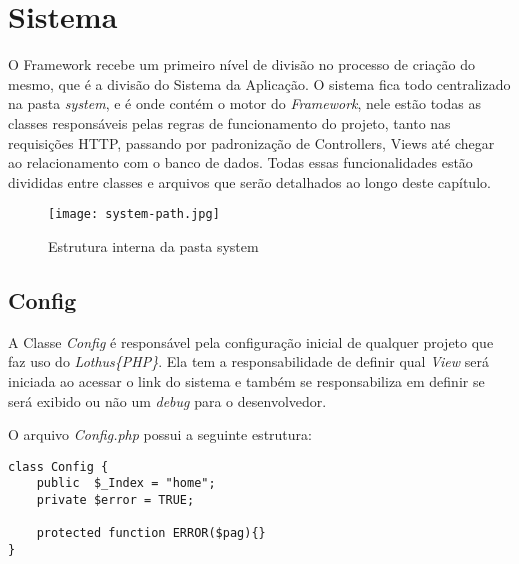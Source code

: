     \section{Sistema\label{sec:system-core}}

        O Framework recebe um primeiro nível de divisão no processo de criação do mesmo, que é a divisão do Sistema da Aplicação. O sistema fica todo centralizado na pasta \emph{system}, e é onde contém o motor do \emph{Framework}, nele estão todas as classes responsáveis pelas regras de funcionamento do projeto, tanto nas requisições HTTP, passando por padronização de Controllers, Views até chegar ao relacionamento com o banco de dados. Todas essas funcionalidades estão divididas entre classes e arquivos que serão detalhados ao longo deste capítulo.

    \begin{figure}[!htb]
        \centering
        \texttt{[image: system-path.jpg]}
        \caption{\small Estrutura interna da pasta system}
        \label{cap:sass}
    \end{figure}



        \subsection{Config\label{sub:system-config}}

            A Classe \emph{Config} é responsável pela configuração inicial de qualquer projeto que faz uso do \emph{Lothus\{PHP\}}. Ela tem a responsabilidade de definir qual \emph{View} será iniciada ao acessar o link do sistema e também se responsabiliza em definir se será exibido ou não um \emph{debug} para o desenvolvedor.

            \emph{}

            O arquivo \emph{Config.php} possui a seguinte estrutura:

            \emph{}

\begin{lstlisting}
class Config {
    public  $_Index = "home";
    private $error = TRUE;

    protected function ERROR($pag){}
}
\end{lstlisting}



